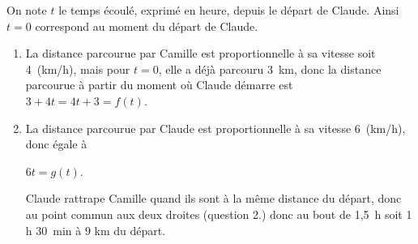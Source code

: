 \documentclass[10pt]{article}
\begin{document}
On note $t$ le temps écoulé, exprimé en heure, depuis le départ de Claude. Ainsi $t = 0$ correspond au moment du départ de Claude.

\begin{enumerate}[resume]
\item %

La distance parcourue par Camille est proportionnelle à sa vitesse soit 4~(km/h), mais pour $t = 0$, elle a déjà parcouru 3~km, donc la distance parcourue à partir du moment où Claude démarre est $3 + 4t = 4t + 3 = f(t)$.
\item %

La distance parcourue par Claude est proportionnelle à sa vitesse 6~(km/h), donc égale à 

$6t = g(t)$.

Claude rattrape Camille quand ils sont à la même distance du départ, donc au point commun aux deux droites (question 2.) donc au bout de 1,5~h soit 1 h 30~min à 9 km du départ.
\end{enumerate}

\end{document}
